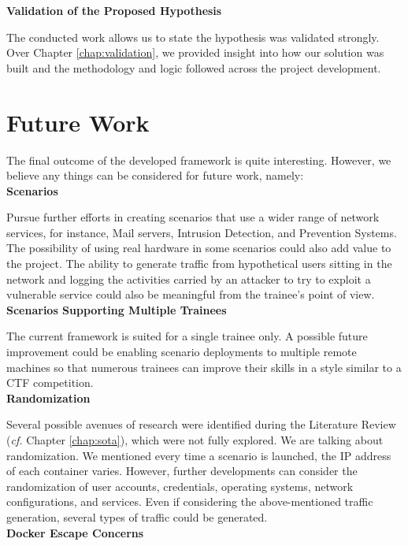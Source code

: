 \textbf{Validation of the Proposed Hypothesis}

The conducted work allows us to state the hypothesis was validated strongly. Over Chapter \ref{chap:validation}, we provided insight into how our solution was built and the methodology and logic followed across the project development.

\section{Future Work} \label{sec:future_work}

The final outcome of the developed framework is quite interesting. However, we believe any things can be considered for future work, namely:\\

\textbf{Scenarios}

Pursue further efforts in creating scenarios that use a wider range of network services, for instance, Mail servers, Intrusion Detection, and Prevention Systems. The possibility of using real hardware in some scenarios could also add value to the project. The ability to generate traffic from hypothetical users sitting in the network and logging the activities carried by an attacker to try to exploit a vulnerable service could also be meaningful from the trainee's point of view.\\

\textbf{Scenarios Supporting Multiple Trainees}

The current framework is suited for a single trainee only. A possible future improvement could be enabling scenario deployments to multiple remote machines so that numerous trainees can improve their skills in a style similar to a CTF competition.\\

\textbf{Randomization}

Several possible avenues of research were identified during the Literature Review (\textit{cf.} Chapter \ref{chap:sota}), which were not fully explored. We are talking about randomization. We mentioned every time a scenario is launched, the IP address of each container varies. However, further developments can consider the randomization of user accounts, credentials, operating systems,  network configurations, and services. Even if considering the above-mentioned traffic generation, several types of traffic could be generated.\\

\textbf{Docker Escape Concerns}

